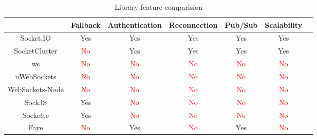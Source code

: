 \begin{table}[h]
  \centering
  \begin{tabular}{|c|c|c|c|c|c|c|}
    \hline
                    & Fallback            & Authentication      & Reconnection        & Pub/Sub             & Scalability         \\ \hline
    Socket.IO       & Yes                 & Yes                 & Yes                 & Yes                 & Yes                 \\ \hline
    SocketCluster   & \textcolor{red}{No} & Yes                 & Yes                 & Yes                 & Yes                 \\ \hline
    ws              & \textcolor{red}{No} & \textcolor{red}{No} & \textcolor{red}{No} & \textcolor{red}{No} & \textcolor{red}{No} \\ \hline
    uWebSockets     & \textcolor{red}{No} & \textcolor{red}{No} & \textcolor{red}{No} & \textcolor{red}{No} & \textcolor{red}{No} \\ \hline
    WebSockets-Node & \textcolor{red}{No} & \textcolor{red}{No} & \textcolor{red}{No} & \textcolor{red}{No} & \textcolor{red}{No} \\ \hline
    SockJS          & Yes                 & \textcolor{red}{No} & \textcolor{red}{No} & \textcolor{red}{No} & \textcolor{red}{No} \\ \hline
    Sockette        & Yes                 & \textcolor{red}{No} & \textcolor{red}{No} & \textcolor{red}{No} & \textcolor{red}{No} \\ \hline
    Faye            & \textcolor{red}{No} & Yes                 & \textcolor{red}{No} & Yes                 & \textcolor{red}{No} \\ \hline
  \end{tabular}
  \caption{Library feature comparision}
\end{table}

